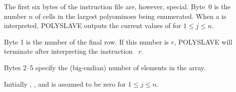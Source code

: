The first six bytes of the instruction file are, however, special.
Byte~0 is the number $n$ of cells in the largest polyominoes being
enumerated. When a  is interpreted, {\mc POLYSLAVE}
outputs the current values of  for $1\le j\le n$.

Byte 1 is the number of the final row. If this number is $r$, {\mc
POLYSLAVE} will terminate after interpreting the instruction ~$r$.

Bytes 2--5 specify the (big-endian) number of elements in the 
array.

Initially , , and  is assumed to be zero
for $1\le j\le n$.

